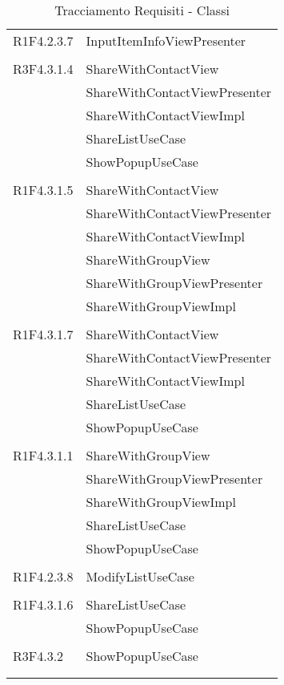 \begin{center}
\begin{longtable}{|p{7cm}|p{7cm}|}
		R1F4.2.3.7 & InputItemInfoViewPresenter \\ & \\ \hline
		R3F4.3.1.4 & ShareWithContactView \\ & ShareWithContactViewPresenter \\ & ShareWithContactViewImpl \\ & ShareListUseCase \\ & ShowPopupUseCase \\ & \\ \hline
		R1F4.3.1.5 & ShareWithContactView \\ & ShareWithContactViewPresenter \\ & ShareWithContactViewImpl \\ & ShareWithGroupView \\ & ShareWithGroupViewPresenter \\ & ShareWithGroupViewImpl \\ & \\ \hline
		R1F4.3.1.7 & ShareWithContactView \\ & ShareWithContactViewPresenter \\ & ShareWithContactViewImpl \\ & ShareListUseCase \\ & ShowPopupUseCase \\ & \\ \hline
		R1F4.3.1.1 & ShareWithGroupView \\ & ShareWithGroupViewPresenter \\ & ShareWithGroupViewImpl \\ & ShareListUseCase \\ & ShowPopupUseCase \\ & \\ \hline
		R1F4.2.3.8 & ModifyListUseCase \\ & \\ \hline
		R1F4.3.1.6 & ShareListUseCase \\ & ShowPopupUseCase \\ & \\ \hline
		R3F4.3.2 & ShowPopupUseCase \\ & \\ \hline
	\caption[Tracciamento Requisiti - Classi]{Tracciamento Requisiti - Classi}
	\label{tabella: Tracciamento Requisiti - Classi}
	\end{longtable}
\end{center}
